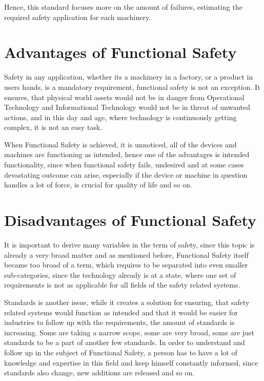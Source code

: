 \documentclass[conference]{IEEEtran}
\begin{document}
Hence, this standard focuses more on the amount of failures, estimating the required safety application for each machinery.

\section{Advantages of Functional Safety}

Safety in any application, whether its a machinery in a factory, or a product in users hands, is a mandatory requirement, functional safety is not an exception. It ensures, that physical world assets would not be in danger from Operational Technology and Informational Technology would not be in threat of unwanted actions, and in this day and age, where technology is continuously getting complex, it is not an easy task.

When Functional Safety is achieved, it is unnoticed, all of the devices and machines are functioning as intended, hence one of the advantages is intended functionality, since when functional safety fails, undesired and at some cases devastating outcome can arise, especially if the device or machine in question handles a lot of force, is crucial for quality of life and so on.

\section{Disadvantages of Functional Safety}

It is important to derive many variables in the term of safety, since this topic is already a very broad matter and as mentioned before, Functional Safety itself became too broad of a term, which requires to be separated into even smaller sub-categories, since the technology already is at a state, where one set of requirements is not as applicable for all fields of the safety related systems.

Standards is another issue, while it creates a solution for ensuring, that safety related systems would function as intended and that it would be easier for industries to follow up with the requirements, the amount of standards is increasing. Some are taking a narrow scope, some are very broad, some are just standards to be a part of another few standards. In order to understand and follow up in the subject of Functional Safety, a person has to have a lot of knowledge and expertise in this field and keep himself constantly informed, since standards also change, new additions are released and so on.
\end{document}
